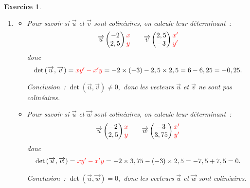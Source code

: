 \documentclass[10pt]{article}
\newtheorem{exo}{Exercice}
\begin{document}
\begin{exo}
\begin{enumerate}
\item

\begin{itemize}
\item[\textbullet] Pour savoir si $\overrightarrow{u}$ et $\overrightarrow{v}$ sont colinéaires, on calcule leur déterminant~:
\[\overrightarrow{u}\begin{pmatrix} -2\\2,5\end{pmatrix} \begin{matrix} \textcolor{red}{
x}\\\textcolor{red}{
y}\end{matrix}\qquad
\overrightarrow{v}\begin{pmatrix} 2,5\\-3\end{pmatrix}\begin{matrix} \textcolor{red}{
x'}\\\textcolor{red}{
y'}\end{matrix}\]
donc
\[\det\left(\overrightarrow{u},\overrightarrow{v}\right)=\textcolor{red}{
xy'-x'y}=-2\times (-3)-2,5\times 2,5=6-6,25=-0,25.\]

Conclusion~: $\det\left(\overrightarrow{u},\overrightarrow{v}\right)\not=0,$ donc les vecteurs $\overrightarrow{u}$ et $\overrightarrow{v}$ ne sont pas colinéaires.

\medskip

\item[\textbullet] Pour savoir si $\overrightarrow{u}$ et $\overrightarrow{w}$ sont colinéaires, on calcule leur déterminant~:
\[\overrightarrow{u}\begin{pmatrix} -2\\2,5\end{pmatrix} \begin{matrix} \textcolor{red}{
x}\\\textcolor{red}{
y}\end{matrix}\qquad
\overrightarrow{w}\begin{pmatrix} -3\\3,75\end{pmatrix}\begin{matrix} \textcolor{red}{
x'}\\\textcolor{red}{
y'}\end{matrix}\]
donc
\[\det\left(\overrightarrow{u},\overrightarrow{w}\right)=\textcolor{red}{
xy'-x'y}=-2\times 3,75-(-3)\times 2,5=-7,5+7,5=0.
\]

Conclusion~: $\det\left(\overrightarrow{u},\overrightarrow{w}\right)=0,$ donc les vecteurs $\overrightarrow{u}$ et $\overrightarrow{w}$ sont colinéaires.
\end{itemize}
\end{enumerate}

\end{exo}
\end{document}

